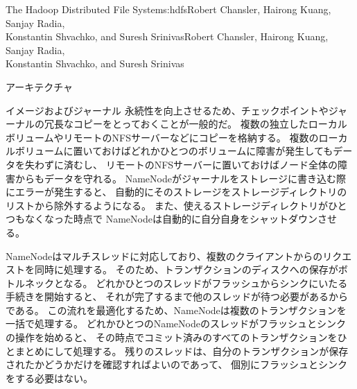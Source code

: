 \begin{aosachaptertoc}{The Hadoop Distributed File System}{s:hdfs}{Robert Chansler, Hairong Kuang, Sanjay Radia, \\ Konstantin Shvachko, and Suresh Srinivas}{Robert Chansler, Hairong Kuang, Sanjay Radia, \\ \hspace*{0.9cm} Konstantin Shvachko, and Suresh Srinivas}
\begin{aosasect1}{アーキテクチャ}
\begin{aosasect2}{イメージおよびジャーナル}
永続性を向上させるため、チェックポイントやジャーナルの冗長なコピーをとっておくことが一般的だ。
複数の独立したローカルボリュームやリモートのNFSサーバーなどにコピーを格納する。
複数のローカルボリュームに置いておけばどれかひとつのボリュームに障害が発生してもデータを失わずに済むし、
リモートのNFSサーバーに置いておけばノード全体の障害からもデータを守れる。
NameNodeがジャーナルをストレージに書き込む際にエラーが発生すると、
自動的にそのストレージをストレージディレクトリのリストから除外するようになる。
また、使えるストレージディレクトリがひとつもなくなった時点で
NameNodeは自動的に自分自身をシャットダウンさせる。

NameNodeはマルチスレッドに対応しており、複数のクライアントからのリクエストを同時に処理する。
そのため、トランザクションのディスクへの保存がボトルネックとなる。
どれかひとつのスレッドがフラッシュからシンクにいたる手続きを開始すると、
それが完了するまで他のスレッドが待つ必要があるからである。
この流れを最適化するため、NameNodeは複数のトランザクションを一括で処理する。
どれかひとつのNameNodeのスレッドがフラッシュとシンクの操作を始めると、
その時点でコミット済みのすべてのトランザクションをひとまとめにして処理する。
残りのスレッドは、自分のトランザクションが保存されたかどうかだけを確認すればよいのであって、
個別にフラッシュとシンクをする必要はない。

\end{aosasect2}


\end{aosasect1}
\end{aosachaptertoc}

